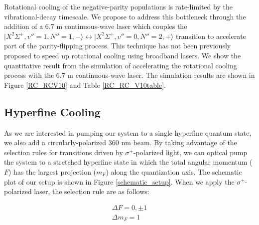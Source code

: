 \documentclass[nofootinbib,aip,jcp,reprint]{revtex4-1}
\begin{document}
Rotational cooling of the negative-parity populations is rate-limited by the vibrational-decay timescale. We propose to address this bottleneck through the addition of a 6.7 {\micro}m continuous-wave laser which couples the $\lvert X^2\Sigma^+, v''=1, N''=1, -\rangle \leftrightarrow \lvert X^2\Sigma^+, v''=0, N''=2, +\rangle$ transition to accelerate part of the parity-flipping process. This technique has not been previously proposed to speed up rotational cooling using broadband lasers. We show the quantitative result from the simulation of accelerating the rotational cooling process with the 6.7 {\micro}m continuous-wave laser. The simulation results are shown in Figure \ref{RC_RCV10} and Table \ref{RC_RC_V10table}.

\subsection{Hyperfine Cooling}
As we are interested in pumping our system to a single hyperfine quantum state, we also add a circularly-polarized 360 nm beam. By taking advantage of the selection rules for transitions driven by $\sigma^+$-polarized light, we can optical pump the system to a stretched hyperfine state in which the total angular momentum ($F$) has the largest projection ($m_F$) along the quantization axis. The schematic plot of our setup is shown in Figure \ref{schematic_setup}. When we apply the $\sigma^+$-polarized laser, the selection rule are as follows:

\begin{align*}
\Delta F=0, \pm 1 \\
\Delta m_F=1
\end{align*}
\end{document}
